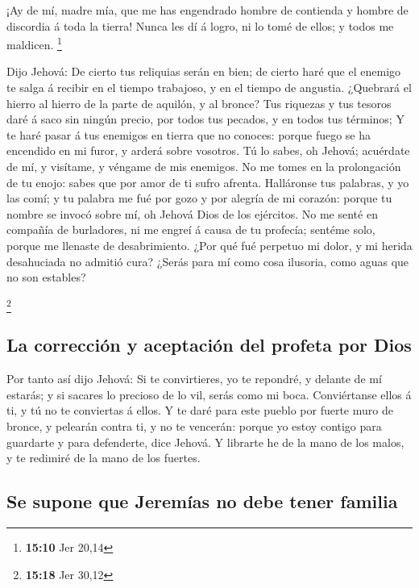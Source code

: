  ¡Ay de mí, madre mía, que me has engendrado hombre de
contienda y hombre de discordia á toda la tierra! Nunca les dí á logro,
ni lo tomé de ellos; y todos me maldicen. \footnote{\textbf{15:10} Jer
  20,14}

 Dijo Jehová: De cierto tus reliquias serán en bien; de
cierto haré que el enemigo te salga á recibir en el tiempo trabajoso, y
en el tiempo de angustia.  ¿Quebrará el hierro al hierro
de la parte de aquilón, y al bronce?  Tus riquezas y tus
tesoros daré á saco sin ningún precio, por todos tus pecados, y en todos
tus términos;  Y te haré pasar á tus enemigos en tierra
que no conoces: porque fuego se ha encendido en mi furor, y arderá sobre
vosotros.  Tú lo sabes, oh Jehová; acuérdate de mí, y
visítame, y véngame de mis enemigos. No me tomes en la prolongación de
tu enojo: sabes que por amor de ti sufro afrenta. 
Halláronse tus palabras, y yo las comí; y tu palabra me fué por gozo y
por alegría de mi corazón: porque tu nombre se invocó sobre mí, oh
Jehová Dios de los ejércitos.  No me senté en compañía de
burladores, ni me engreí á causa de tu profecía; sentéme solo, porque me
llenaste de desabrimiento.  ¿Por qué fué perpetuo mi
dolor, y mi herida desahuciada no admitió cura? ¿Serás para mí como cosa
ilusoria, como aguas que no son estables?

\footnote{\textbf{15:18} Jer 30,12}

\hypertarget{la-correcciuxf3n-y-aceptaciuxf3n-del-profeta-por-dios}{%
\subsection{La corrección y aceptación del profeta por
Dios}\label{la-correcciuxf3n-y-aceptaciuxf3n-del-profeta-por-dios}}

 Por tanto así dijo Jehová: Si te convirtieres, yo te
repondré, y delante de mí estarás; y si sacares lo precioso de lo vil,
serás como mi boca. Conviértanse ellos á ti, y tú no te conviertas á
ellos.  Y te daré para este pueblo por fuerte muro de
bronce, y pelearán contra ti, y no te vencerán: porque yo estoy contigo
para guardarte y para defenderte, dice Jehová.  Y
librarte he de la mano de los malos, y te redimiré de la mano de los
fuertes.

\hypertarget{se-supone-que-jeremuxedas-no-debe-tener-familia}{%
\subsection{Se supone que Jeremías no debe tener
familia}\label{se-supone-que-jeremuxedas-no-debe-tener-familia}}

